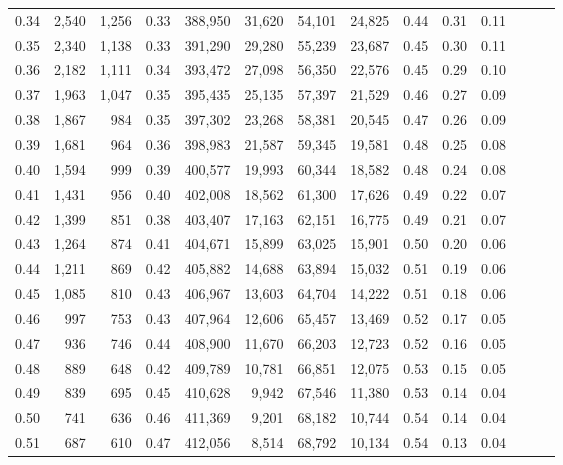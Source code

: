 \begin{tabular}{rrrrrrrrrrrrrr}
0.34 &   2,540 &  1,256 &  0.33 &  388,950 &   31,620 &  54,101 &  24,825 &  0.44 &  0.31 &      0.11 \\
0.35 &   2,340 &  1,138 &  0.33 &  391,290 &   29,280 &  55,239 &  23,687 &  0.45 &  0.30 &      0.11 \\
0.36 &   2,182 &  1,111 &  0.34 &  393,472 &   27,098 &  56,350 &  22,576 &  0.45 &  0.29 &      0.10 \\
0.37 &   1,963 &  1,047 &  0.35 &  395,435 &   25,135 &  57,397 &  21,529 &  0.46 &  0.27 &      0.09 \\
0.38 &   1,867 &    984 &  0.35 &  397,302 &   23,268 &  58,381 &  20,545 &  0.47 &  0.26 &      0.09 \\
0.39 &   1,681 &    964 &  0.36 &  398,983 &   21,587 &  59,345 &  19,581 &  0.48 &  0.25 &      0.08 \\
0.40 &   1,594 &    999 &  0.39 &  400,577 &   19,993 &  60,344 &  18,582 &  0.48 &  0.24 &      0.08 \\
0.41 &   1,431 &    956 &  0.40 &  402,008 &   18,562 &  61,300 &  17,626 &  0.49 &  0.22 &      0.07 \\
0.42 &   1,399 &    851 &  0.38 &  403,407 &   17,163 &  62,151 &  16,775 &  0.49 &  0.21 &      0.07 \\
0.43 &   1,264 &    874 &  0.41 &  404,671 &   15,899 &  63,025 &  15,901 &  0.50 &  0.20 &      0.06 \\
0.44 &   1,211 &    869 &  0.42 &  405,882 &   14,688 &  63,894 &  15,032 &  0.51 &  0.19 &      0.06 \\
0.45 &   1,085 &    810 &  0.43 &  406,967 &   13,603 &  64,704 &  14,222 &  0.51 &  0.18 &      0.06 \\
0.46 &     997 &    753 &  0.43 &  407,964 &   12,606 &  65,457 &  13,469 &  0.52 &  0.17 &      0.05 \\
0.47 &     936 &    746 &  0.44 &  408,900 &   11,670 &  66,203 &  12,723 &  0.52 &  0.16 &      0.05 \\
0.48 &     889 &    648 &  0.42 &  409,789 &   10,781 &  66,851 &  12,075 &  0.53 &  0.15 &      0.05 \\
0.49 &     839 &    695 &  0.45 &  410,628 &    9,942 &  67,546 &  11,380 &  0.53 &  0.14 &      0.04 \\
0.50 &     741 &    636 &  0.46 &  411,369 &    9,201 &  68,182 &  10,744 &  0.54 &  0.14 &      0.04 \\
0.51 &     687 &    610 &  0.47 &  412,056 &    8,514 &  68,792 &  10,134 &  0.54 &  0.13 &      0.04 \\

\end{tabular}
